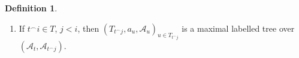 \documentclass[12pt,a4paper]{amsart}
\theoremstyle{definition}
\newtheorem{defn}[thm]{Definition}
\theoremstyle{remark}
\begin{document}
\begin{defn}
\begin{enumerate}
        

If $t^\frown i\in T$, is such that $(T_{t^\frown i}, a_u, \mathcal{A}_u)_{u\in T_{t^\frown i}}$ is a maximal good labelled tree over $(\mathcal{A}_t,\mathcal{A}_{t^\frown i})$ and for all $j<i$, $(T_{t^\frown j}, a_u, \mathcal{A}_u)_{u\in T_{t^\frown j}}$ is not isomorphic to $(T_{t^\frown i}, a_u, \mathcal{A}_u)_{u\in T_{t^\frown i}}$ over  $\mathcal{A}_t$. Then for all $j<i$, there is no good labelled tree $(T', a'_u, \mathcal{A}'_u)_{u\in T'}$ over $(\mathcal{A}'_r, \mathcal{A}'_{r^+})$, where $r$ is the root of $T'$, such that it is a maximal labelled tree over $(\mathcal{A}'_r, \mathcal{A}'_{r^+})$, $\mathcal{A}'_r=\mathcal{A}_t$, and $(T', a'_u, \mathcal{A}'_u)_{u\in T'}$ is isomorphic to $(T_{t^\frown j}, a_u, \mathcal{A}_u)_{u\in T_{t^\frown j}}$ over $\mathcal{A}_t$ and $$a_{r^+}\downarrow_{\mathcal{A}_t} \bigcup_{k<i}a_{t^\frown k}.$$

        

        \item If $t^\frown i\in T$, $j<i$, then $(T_{t^\frown j},a_u,\mathcal{A}_u)_{u\in T_{t^\frown j}}$ is a maximal labelled tree over $(\mathcal{A}_t,\mathcal{A}_{t^\frown j})$.
    \end{enumerate}
\end{defn}
\end{document}
